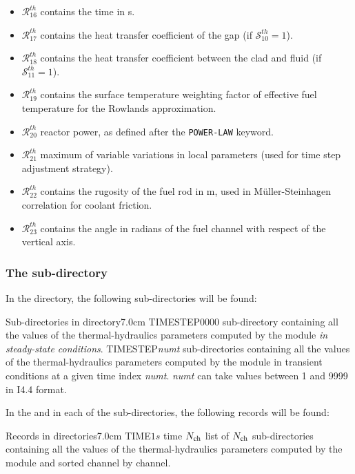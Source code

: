 \begin{itemize}
\item $\mathcal{R}^{th}_{16}$ contains the time in s.
\item $\mathcal{R}^{th}_{17}$ contains the heat transfer coefficient of the gap (if $\mathcal{S}^{th}_{10}=1$).
\item $\mathcal{R}^{th}_{18}$ contains the heat transfer coefficient between the clad and fluid (if $\mathcal{S}^{th}_{11}=1$).
\item $\mathcal{R}^{th}_{19}$ contains the surface temperature weighting factor of effective fuel temperature for the Rowlands approximation.
\item $\mathcal{R}^{th}_{20}$ reactor power, as defined after the {\tt POWER-LAW} keyword.
\item $\mathcal{R}^{th}_{21}$ maximum of variable variations in local parameters (used for time step adjustment strategy).
\item $\mathcal{R}^{th}_{22}$ contains the rugosity of the fuel rod in m, used in M\"uller-Steinhagen correlation for coolant friction.
\item $\mathcal{R}^{th}_{23}$ contains the angle in radians of the fuel channel with respect of the vertical axis.
\end{itemize}

\subsubsection{The  sub-directory}\label{sect:thmdirhistorydata}

In the  directory, the following sub-directories will be found:
\begin{DescriptionEnregistrement}{Sub-directories in  directory}{7.0cm} \label{tabl:tabhistorydatadir}
 \DirEnr
 {TIMESTEP0000}
 {sub-directory containing all the values of the thermal-hydraulics parameters computed by the  module {\sl in steady-state conditions}.}
 \DirEnr
 {TIMESTEP{\sl numt}}
 {sub-directories containing all the values of the thermal-hydraulics parameters computed by the  module in transient conditions at a given time index {\sl numt}. {\sl numt} can take values between 1 and 9999 in I4.4 format.}
\end{DescriptionEnregistrement}

\noindent In the  and in each of the  sub-directories, the following records will be found:
\begin{DescriptionEnregistrement}{Records in  directories}{7.0cm} \label{tabl:tabtimestepdir}
 \RealEnr
 {TIME}{$1$}{$s$}
 {time}
 \DirlEnr
 {}{$N_{\rm ch}$}
 {list of $N_{\rm ch}$ sub-directories containing all the values of the thermal-hydraulics parameters computed by the  module and sorted channel by channel.}
\end{DescriptionEnregistrement}

